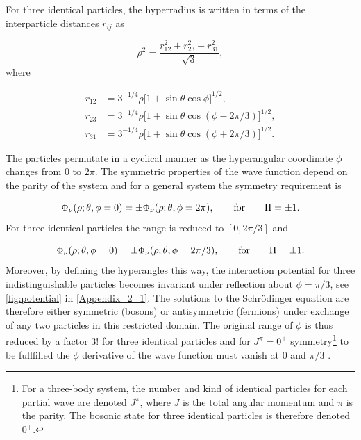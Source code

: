 For three identical particles, the hyperradius is written in terms of the interparticle distances $r_{ij}$ as

\begin{equation}
\rho^2 = \frac{r_{12}^2+r_{23}^2+r_{31}^2}{\sqrt{3}},
\end{equation}
where 

\begin{equation}
\begin{aligned}
r_{12} &= 3^{-1/4}\rho\big[1+\sin\theta\cos\phi\big]^{1/2},\\
r_{23} &= 3^{-1/4}\rho\big[1 + \sin\theta\cos(\phi-2\pi/3)\big]^{1/2},\\
r_{31} &= 3^{-1/4}\rho\big[1 + \sin\theta\cos(\phi + 2\pi/3)\big]^{1/2}.
\end{aligned}
\end{equation}

The particles permutate in a cyclical manner as the hyperangular coordinate $\phi$ changes from $0$ to $2\pi$. The symmetric properties of the wave function depend on the parity of the system and for a general system the symmetry requirement is

\begin{equation}
\Phi_{\nu}(\rho;\theta,\phi = 0) = \pm \Phi_{\nu}(\rho;\theta,\phi = 2\pi), \qquad \text{for} \qquad \Pi = \pm 1.\\
\end{equation}
For three identical particles the range is reduced to $[0,2\pi/3]$ and 

\begin{equation}
\Phi_{\nu}(\rho;\theta,\phi = 0) = \pm \Phi_{\nu}(\rho;\theta,\phi = 2\pi/3), \qquad \text{for} \qquad \Pi = \pm 1.\\
\end{equation}
Moreover, by defining the hyperangles this way, the interaction potential for three indistinguishable particles becomes invariant under reflection about $\phi=\pi/3$, see \cref{fig:potential} in \cref{Appendix_2_1}. The solutions to the Schr{\"o}dinger equation are therefore either symmetric (bosons) or antisymmetric (fermions) under exchange of any two particles in this restricted domain. The original range of $\phi$ is thus reduced by a factor $3!$ for three identical particles and for $J^{\pi} = 0^+$  symmetry\footnote{For a three-body system, the number and kind of identical particles for each partial wave are denoted $J^{\pi}$, where $J$ is the total angular momentum and $\pi$ is the parity. The bosonic state for three identical particles is therefore denoted $0^+$.} to be fullfilled the $\phi$ derivative of the wave function must vanish at $0$ and $\pi/3$ \cite{EsryGreeneSuno2001}.

